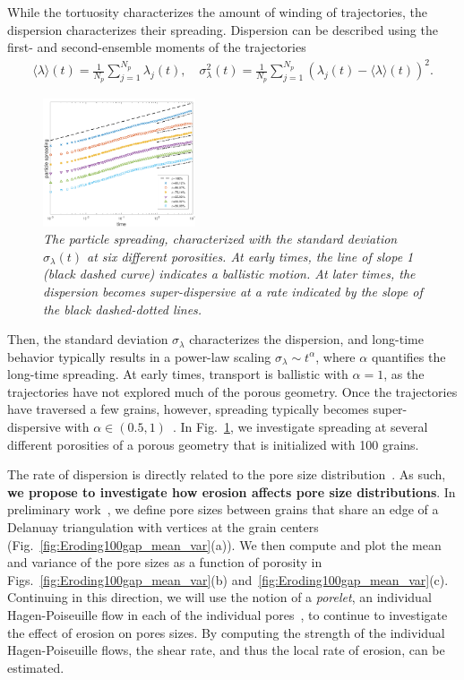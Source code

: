 \documentclass[11pt]{article}
\begin{document}
While the tortuosity characterizes the amount of winding of trajectories, the dispersion characterizes their spreading.  Dispersion can be described using the first- and second-ensemble moments of the trajectories
\begin{align}
  \langle \lambda \rangle (t) = \frac{1}{N_p} 
      \sum_{j=1}^{N_p} \lambda_j(t), \quad
  \sigma_\lambda^{2}(t) = \frac{1}{N_p}
    \sum_{j=1}^{N_p} (\lambda_j(t) - \langle \lambda \rangle(t))^2.
\end{align}
\begin{figure}
  \includegraphics[width=0.4\textwidth]{figs/100b_second_moment_long_ref}
  \caption{\label{fig:100dispersion} \em The particle spreading, characterized with the standard deviation $\sigma_\lambda(t)$ at six different porosities. At early times, the line of slope 1 (black dashed curve) indicates a ballistic motion. At later times, the dispersion becomes super-dispersive at a rate indicated by the slope of the black dashed-dotted lines.}
\end{figure}
Then, the standard deviation $\sigma_\lambda$ characterizes the dispersion, and long-time behavior typically results in a power-law scaling $\sigma_\lambda \sim t^{\alpha}$, where $\alpha$ quantifies the long-time spreading. At early times, transport is ballistic with $\alpha = 1$, as the trajectories have not explored much of the porous geometry.  Once the trajectories have traversed a few grains, however, spreading typically becomes super-dispersive with $\alpha \in (0.5,1)$~\cite{dea-leb-den-tar-bol-dav2013}. In Fig.~\ref{fig:100dispersion}, we investigate spreading at several different porosities of a porous geometry that is initialized with 100 grains.

The rate of dispersion is directly related to the pore size distribution~\cite{dea-qua-bir-jua2018}. As such, {\bf we propose to investigate how erosion affects pore size distributions}. In preliminary work~\cite{chi-moo-qua2019}, we define pore sizes between grains that share an edge of a Delanuay triangulation with vertices at the grain centers (Fig.~\ref{fig:Eroding100gap_mean_var}(a)).  We then compute and plot the mean and variance of the pore sizes as a function of porosity in Figs.~\ref{fig:Eroding100gap_mean_var}(b) and~\ref{fig:Eroding100gap_mean_var}(c). Continuing in this direction, we will use the notion of a {\em porelet}, an individual Hagen-Poiseuille flow in each of the individual pores~\cite{dea-qua-bir-jua2018}, to continue to investigate the effect of erosion on pores sizes. By computing the strength of the individual Hagen-Poiseuille flows, the shear rate, and thus the local rate of erosion, can be estimated.
\end{document}
